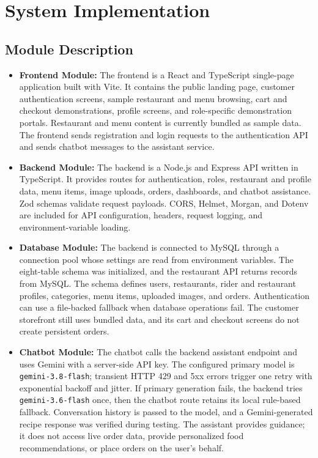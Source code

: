 \chapter{System Implementation}

\section{Module Description}

\begin{itemize}

\item \textbf{Frontend Module:}
The frontend is a React and TypeScript single-page application built with Vite. It contains the public landing page, customer authentication screens, sample restaurant and menu browsing, cart and checkout demonstrations, profile screens, and role-specific demonstration portals. Restaurant and menu content is currently bundled as sample data. The frontend sends registration and login requests to the authentication API and sends chatbot messages to the assistant service.

\item \textbf{Backend Module:}
The backend is a Node.js and Express API written in TypeScript. It provides routes for authentication, roles, restaurant and profile data, menu items, image uploads, orders, dashboards, and chatbot assistance. Zod schemas validate request payloads. CORS, Helmet, Morgan, and Dotenv are included for API configuration, headers, request logging, and environment-variable loading.

\item \textbf{Database Module:}
The backend is connected to MySQL through a connection pool whose settings are read from environment variables. The eight-table schema was initialized, and the restaurant API returns records from MySQL. The schema defines users, restaurants, rider and restaurant profiles, categories, menu items, uploaded images, and orders. Authentication can use a file-backed fallback when database operations fail. The customer storefront still uses bundled data, and its cart and checkout screens do not create persistent orders.

\item \textbf{Chatbot Module:}
The chatbot calls the backend assistant endpoint and uses Gemini with a server-side API key. The configured primary model is \texttt{gemini-3.8-flash}; transient HTTP 429 and 5xx errors trigger one retry with exponential backoff and jitter. If primary generation fails, the backend tries \texttt{gemini-3.6-flash} once, then the chatbot route retains its local rule-based fallback. Conversation history is passed to the model, and a Gemini-generated recipe response was verified during testing. The assistant provides guidance; it does not access live order data, provide personalized food recommendations, or place orders on the user's behalf.

\end{itemize}

